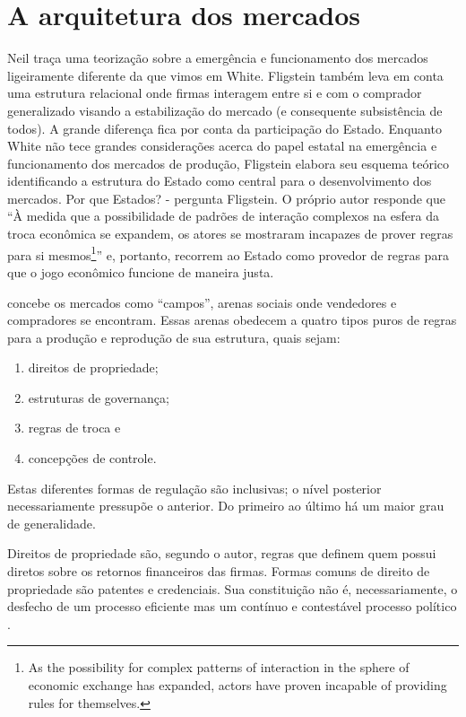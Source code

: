 \documentclass[a4paper, 12pt, openright, oneside, german, french, english, brazil]{abntex2}
\begin{document}
	\section{A arquitetura dos mercados}

	Neil  traça uma teorização sobre a emergência e funcionamento dos mercados ligeiramente diferente da que vimos em White. Fligstein também leva em conta uma estrutura relacional onde firmas interagem entre si e com o comprador generalizado visando a estabilização do mercado (e consequente subsistência de todos). A grande diferença fica por conta da participação do Estado. Enquanto White não tece grandes considerações acerca do papel estatal na emergência e funcionamento dos mercados de produção, Fligstein elabora seu esquema teórico identificando a estrutura do Estado como central para o desenvolvimento dos mercados. Por que Estados? - pergunta Fligstein. O próprio autor responde que ``À medida que a possibilidade de padrões de interação complexos na esfera da troca econômica se expandem, os atores se mostraram incapazes de prover regras para si mesmos\footnote{As the possibility for complex patterns of interaction in the sphere of economic exchange has expanded, actors have proven incapable of providing rules for themselves.}'' \cite[p. 27-8]{fligstein2002architecture} e, portanto, recorrem ao Estado como provedor de regras para que o jogo econômico funcione de maneira justa.

	 concebe os mercados como ``campos'', arenas sociais onde vendedores e compradores se encontram. Essas arenas obedecem a quatro tipos puros de regras para a produção e reprodução de sua estrutura, quais sejam:

	\begin{enumerate}
		\item direitos de propriedade;
		\item estruturas de governança;
		\item regras de troca e
		\item concepções de controle.
	\end{enumerate}

	Estas diferentes formas de regulação são inclusivas; o nível posterior necessariamente pressupõe o anterior. Do primeiro ao último há um maior grau de generalidade.

	Direitos de propriedade são, segundo o autor, regras que definem quem possui diretos sobre os retornos financeiros das firmas. Formas comuns de direito de propriedade são patentes e credenciais. Sua constituição não é, necessariamente, o desfecho de um processo eficiente mas um contínuo e contestável processo político \cite{fligstein2002architecture}.
\end{document}
